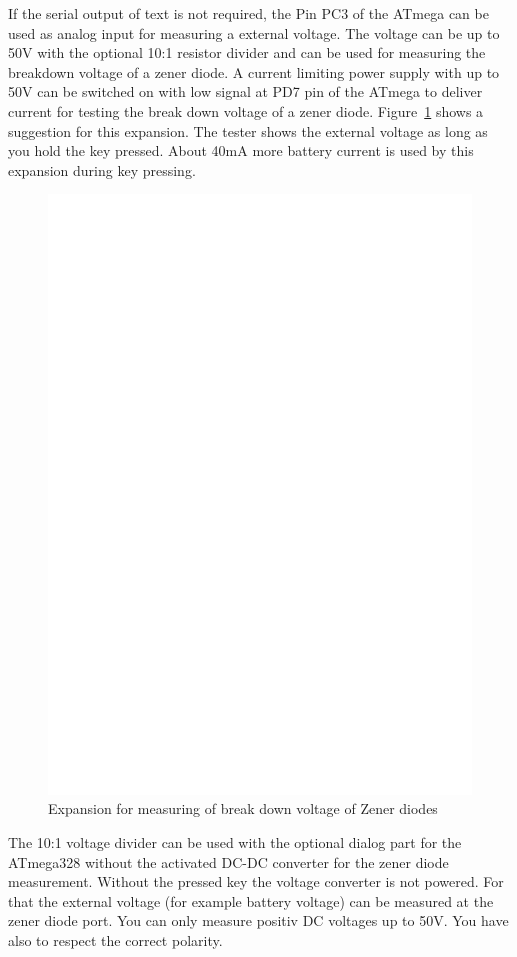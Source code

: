 If the serial output of text is not required, the Pin PC3 of the ATmega can be used as analog
input for measuring a external voltage. The voltage can be up to 50V with the optional 10:1 resistor
divider and can be used for measuring the breakdown voltage of a zener diode. 
A current limiting power supply with up to 50V can be switched on with low signal at PD7 pin of the
ATmega to deliver current for testing the break down voltage of a zener diode.
Figure~\ref{fig:zener} shows a suggestion for this expansion.
The tester shows the external voltage as long as you hold the key pressed.
About 40mA more battery current is used by this expansion during key pressing.

\begin{figure}[H]
\centering
\includegraphics[width=12cm]{../FIG/zener_exp.eps}
\caption{Expansion for measuring of break down voltage of Zener diodes}
\label{fig:zener}
\end{figure}

The 10:1 voltage divider can be used with the optional dialog part for the ATmega328 without the 
activated DC-DC converter for the zener diode measurement.
Without the pressed key the voltage converter is not powered. For that the external voltage 
(for example battery voltage) can be measured at the zener diode port.
You can only measure positiv DC voltages up to 50V.
You have also to respect the correct polarity.

